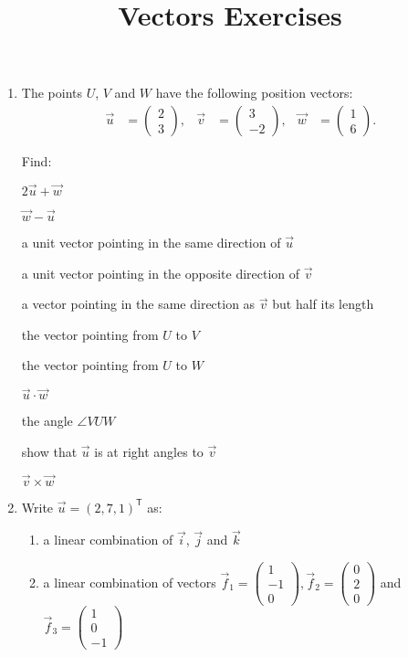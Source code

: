 \documentclass[a4paper,11pt]{article}
\title{Vectors Exercises}
\begin{document}
\maketitle

\begin{enumerate}[label=3.\arabic*]
    \item The points $U$, $V$ and $W$ have the following position vectors:
    \begin{align*}
        \vec{u} &= \begin{pmatrix} 2 \\ 3 \end{pmatrix}, &
        \vec{v} &= \begin{pmatrix} 3 \\ -2 \end{pmatrix}, &
        \vec{w} &= \begin{pmatrix} 1 \\ 6 \end{pmatrix}.
    \end{align*}

    Find:
    \begin{tasks}
        \task $2 \vec{u} + \vec{w}$

        \task $\vec{w} - \vec{u}$

        \task a unit vector pointing in the same direction of $\vec{u}$

        \task a unit vector pointing in the opposite direction of $\vec{v}$

        \task a vector pointing in the same direction as $\vec{v}$ but half its length 

        \task the vector pointing from $U$ to $V$

        \task the vector pointing from $U$ to $W$

        \task $\vec{u} \cdot \vec{w}$

        \task the angle $\angle VUW$

        \task show that $\vec{u}$ is at right angles to $\vec{v}$

        \task $\vec{v} \times \vec{w}$
    \end{tasks}

    \item Write $\vec{u} = (2,7,1)^\mathsf{T}$ as:
    \begin{enumerate}
        \item a linear combination of $\vec{i}$, $\vec{j}$ and $\vec{k}$
        \item a linear combination of vectors $\vec{f}_1 = \begin{pmatrix} 1 \\ -1 \\ 0 \end{pmatrix}, \vec{f}_2 = \begin{pmatrix} 0 \\ 2 \\ 0 \end{pmatrix}$ and $\vec{f}_3 = \begin{pmatrix} 1 \\ 0 \\ -1 \end{pmatrix}$
    \end{enumerate}


\end{enumerate}
\end{document}

